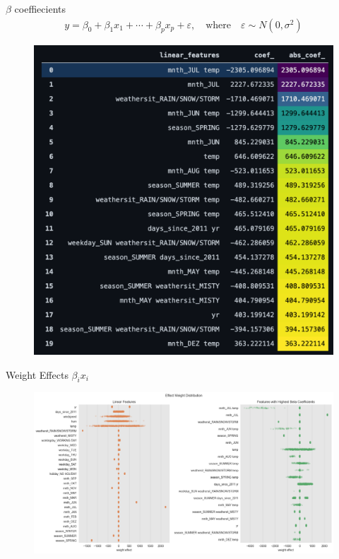 \documentclass[10pt]{beamer}
\begin{document}
\begin{frame}{$\beta$ coeffiecients}
\begin{align*}
y = \beta_{0} + \beta_{1}x_{1} + \cdots + \beta_{p}x_{p} + \varepsilon, \quad \text{where} \quad \varepsilon \sim N(0, \sigma^2)
\end{align*}
\begin{center}
  \begin{figure}
    \includegraphics[scale=0.3]{images/lm_beta_table.png} 
  \end{figure}
\end{center}
\end{frame}

\begin{frame}{Weight Effects $\beta_{i}x_{i}$}
\begin{center}
  \begin{figure}
    \includegraphics[scale=0.3]{images/interpretable_ml_61_0.png}
  \end{figure}
\end{center}
\end{frame}
\end{document}
